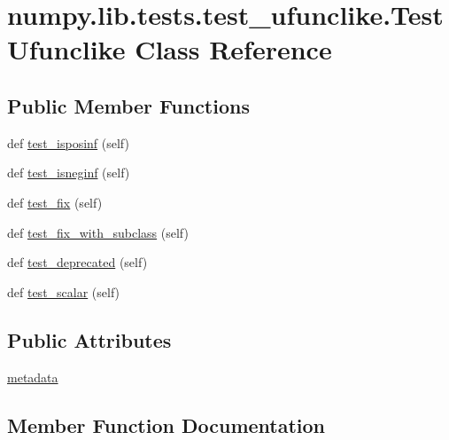 \hypertarget{classnumpy_1_1lib_1_1tests_1_1test__ufunclike_1_1TestUfunclike}{}\section{numpy.\+lib.\+tests.\+test\+\_\+ufunclike.\+Test\+Ufunclike Class Reference}
\label{classnumpy_1_1lib_1_1tests_1_1test__ufunclike_1_1TestUfunclike}
\subsection*{Public Member Functions}
\begin{DoxyCompactItemize}
\item 
def \hyperlink{classnumpy_1_1lib_1_1tests_1_1test__ufunclike_1_1TestUfunclike_a792baf7ebf79b3ac25196a3b6c1fd133}{test\+\_\+isposinf} (self)
\item 
def \hyperlink{classnumpy_1_1lib_1_1tests_1_1test__ufunclike_1_1TestUfunclike_a2403d0c041b939cd612d65cceb522add}{test\+\_\+isneginf} (self)
\item 
def \hyperlink{classnumpy_1_1lib_1_1tests_1_1test__ufunclike_1_1TestUfunclike_ab55820e91a99d693a7b476ec43cb7954}{test\+\_\+fix} (self)
\item 
def \hyperlink{classnumpy_1_1lib_1_1tests_1_1test__ufunclike_1_1TestUfunclike_ad62123d0d846126090fcb24b63cb4f34}{test\+\_\+fix\+\_\+with\+\_\+subclass} (self)
\item 
def \hyperlink{classnumpy_1_1lib_1_1tests_1_1test__ufunclike_1_1TestUfunclike_ab225665548254653d985e4a50e7ecbdd}{test\+\_\+deprecated} (self)
\item 
def \hyperlink{classnumpy_1_1lib_1_1tests_1_1test__ufunclike_1_1TestUfunclike_a18d03b87605df131623232ad1404ba3f}{test\+\_\+scalar} (self)
\end{DoxyCompactItemize}
\subsection*{Public Attributes}
\begin{DoxyCompactItemize}
\item 
\hyperlink{classnumpy_1_1lib_1_1tests_1_1test__ufunclike_1_1TestUfunclike_a66ee5d6535c5a4e0c69b3c2cd7daddb8}{metadata}
\end{DoxyCompactItemize}


\subsection{Member Function Documentation}
\mbox{\label{classnumpy_1_1lib_1_1tests_1_1test__ufunclike_1_1TestUfunclike_ab225665548254653d985e4a50e7ecbdd}} 
